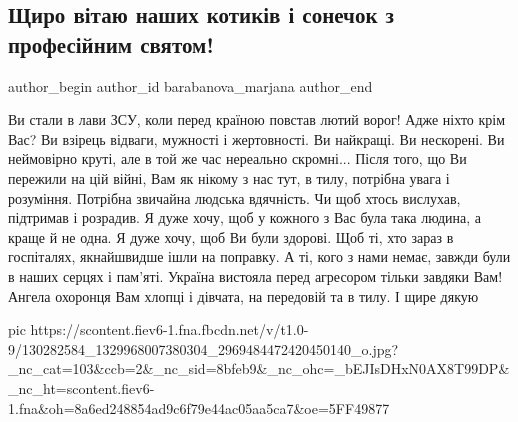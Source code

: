  
 
 
 
 
\subsection{Щиро вітаю наших котиків і сонечок з професійним святом!}
\label{sec:06_12_2020.fb.marjana_barabanova.1.vitannja_zsu}
\ifcmt
  author_begin
   author_id barabanova_marjana
  author_end
\fi


\obeycr
Ви стали в лави ЗСУ, коли перед країною повстав лютий ворог!
Адже ніхто крім Вас?
Ви взірець відваги, мужності і жертовності.
Ви найкращі.
Ви нескорені.
Ви неймовірно круті, але в той же час нереально скромні...
Після того, що Ви пережили на цій війні, Вам як нікому з нас тут, в тилу, потрібна увага і розуміння. 
Потрібна звичайна людська вдячність.
Чи щоб хтось вислухав, підтримав і розрадив.
Я дуже хочу, щоб у кожного з Вас була така людина, а краще й не одна.
Я дуже хочу, щоб Ви були здорові.
Щоб ті, хто зараз в госпіталях, якнайшвидше ішли на поправку.
А ті, кого з нами немає, завжди були в наших серцях і пам'яті.
Україна вистояла перед агресором тільки завдяки Вам!
Ангела охоронця Вам хлопці і дівчата, на передовій та в тилу.
І щире дякую 
\restorecr

\ifcmt
pic https://scontent.fiev6-1.fna.fbcdn.net/v/t1.0-9/130282584_1329968007380304_2969484472420450140_o.jpg?_nc_cat=103&ccb=2&_nc_sid=8bfeb9&_nc_ohc=_bEJIsDHxN0AX8T99DP&_nc_ht=scontent.fiev6-1.fna&oh=8a6ed248854ad9c6f79e44ac05aa5ca7&oe=5FF49877
\fi
